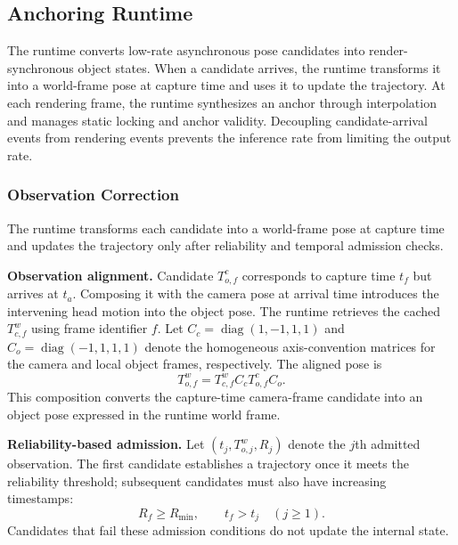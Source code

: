 \documentclass[review]{vgtc}
\begin{document}
\subsection{Anchoring Runtime}\label{sec:anchoring}

The runtime converts low-rate asynchronous pose candidates into render-synchronous object states. When a candidate arrives, the runtime transforms it into a world-frame pose at capture time and uses it to update the trajectory. At each rendering frame, the runtime synthesizes an anchor through interpolation and manages static locking and anchor validity. Decoupling candidate-arrival events from rendering events prevents the inference rate from limiting the output rate.

\subsubsection{Observation Correction}\label{sec:obs-update}

The runtime transforms each candidate into a world-frame pose at capture time and updates the trajectory only after reliability and temporal admission checks.

\textbf{Observation alignment.}
Candidate $T_{o,f}^{c}$ corresponds to capture time $t_f$ but arrives at $t_a$. Composing it with the camera pose at arrival time introduces the intervening head motion into the object pose. The runtime retrieves the cached $T_{c,f}^{w}$ using frame identifier $f$. Let $C_c=\operatorname{diag}(1,-1,1,1)$ and $C_o=\operatorname{diag}(-1,1,1,1)$ denote the homogeneous axis-convention matrices for the camera and local object frames, respectively. The aligned pose is
\begin{equation}
T_{o,f}^{w}=T_{c,f}^{w}C_cT_{o,f}^{c}C_o.
\label{eq:capture-alignment}
\end{equation}
This composition converts the capture-time camera-frame candidate
into an object pose expressed in the runtime world frame.

\textbf{Reliability-based admission.}
Let $(t_j,T_{o,j}^{w},R_j)$ denote the $j$th admitted observation. The first candidate establishes a trajectory once it meets the reliability threshold; subsequent candidates must also have increasing timestamps:
\begin{equation}
R_f \geq R_{\min}, \qquad t_f > t_j \quad (j \geq 1).
\label{eq:admission}
\end{equation}
Candidates that fail these admission conditions do not update the internal state.
\end{document}

